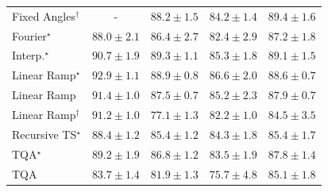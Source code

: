 \begin{tabular}{l|cccc|}
Fixed Angles$^\dagger$ & {\cellcolor[HTML]{000000}} \color[HTML]{F1F1F1} {\cellcolor{white}} \color{black} - & {\cellcolor[HTML]{006737}} \color[HTML]{F1F1F1} $88.2\pm 1.5$ & {\cellcolor[HTML]{197C40}} \color[HTML]{F1F1F1} $84.2\pm 1.4$ & {\cellcolor[HTML]{005F34}} \color[HTML]{F1F1F1} $89.4\pm 1.6$ \\
Fourier$^\star$ & {\cellcolor[HTML]{006837}} \color[HTML]{F1F1F1} $88.0\pm 2.1$ & {\cellcolor[HTML]{0B713B}} \color[HTML]{F1F1F1} $86.4\pm 2.7$ & {\cellcolor[HTML]{258745}} \color[HTML]{F1F1F1} $82.4\pm 2.9$ & {\cellcolor[HTML]{066D39}} \color[HTML]{F1F1F1} $87.2\pm 1.8$ \\
Interp.$^\star$ & {\cellcolor[HTML]{005730}} \color[HTML]{F1F1F1} $90.7\pm 1.9$ & {\cellcolor[HTML]{005F34}} \color[HTML]{F1F1F1} $89.3\pm 1.1$ & {\cellcolor[HTML]{12763D}} \color[HTML]{F1F1F1} $85.3\pm 1.8$ & {\cellcolor[HTML]{006034}} \color[HTML]{F1F1F1} $89.1\pm 1.5$ \\
Linear Ramp$^\star$ & {\cellcolor[HTML]{00482A}} \color[HTML]{F1F1F1} $92.9\pm 1.1$ & {\cellcolor[HTML]{006335}} \color[HTML]{F1F1F1} $88.9\pm 0.8$ & {\cellcolor[HTML]{0A703A}} \color[HTML]{F1F1F1} $86.6\pm 2.0$ & {\cellcolor[HTML]{006435}} \color[HTML]{F1F1F1} $88.6\pm 0.7$ \\
Linear Ramp & {\cellcolor[HTML]{00522E}} \color[HTML]{F1F1F1} $91.4\pm 1.0$ & {\cellcolor[HTML]{036B38}} \color[HTML]{F1F1F1} $87.5\pm 0.7$ & {\cellcolor[HTML]{13773D}} \color[HTML]{F1F1F1} $85.2\pm 2.3$ & {\cellcolor[HTML]{016937}} \color[HTML]{F1F1F1} $87.9\pm 0.7$ \\
Linear Ramp$^\dagger$ & {\cellcolor[HTML]{00532F}} \color[HTML]{F1F1F1} $91.2\pm 1.0$ & {\cellcolor[HTML]{45AD5F}} \color[HTML]{F1F1F1} $77.1\pm 1.3$ & {\cellcolor[HTML]{268846}} \color[HTML]{F1F1F1} $82.2\pm 1.0$ & {\cellcolor[HTML]{177B3F}} \color[HTML]{F1F1F1} $84.5\pm 3.5$ \\
Recursive TS$^\star$ & {\cellcolor[HTML]{006636}} \color[HTML]{F1F1F1} $88.4\pm 1.2$ & {\cellcolor[HTML]{12763D}} \color[HTML]{F1F1F1} $85.4\pm 1.2$ & {\cellcolor[HTML]{187B3F}} \color[HTML]{F1F1F1} $84.3\pm 1.8$ & {\cellcolor[HTML]{12763D}} \color[HTML]{F1F1F1} $85.4\pm 1.7$ \\
TQA$^\star$ & {\cellcolor[HTML]{006034}} \color[HTML]{F1F1F1} $89.2\pm 1.9$ & {\cellcolor[HTML]{086E3A}} \color[HTML]{F1F1F1} $86.8\pm 1.2$ & {\cellcolor[HTML]{1E8041}} \color[HTML]{F1F1F1} $83.5\pm 1.9$ & {\cellcolor[HTML]{016937}} \color[HTML]{F1F1F1} $87.8\pm 1.4$ \\
TQA & {\cellcolor[HTML]{1D7F41}} \color[HTML]{F1F1F1} $83.7\pm 1.4$ & {\cellcolor[HTML]{288A47}} \color[HTML]{F1F1F1} $81.9\pm 1.3$ & {\cellcolor[HTML]{53B466}} \color[HTML]{F1F1F1} $75.7\pm 4.8$ & {\cellcolor[HTML]{14783E}} \color[HTML]{F1F1F1} $85.1\pm 1.8$ \\

\end{tabular}
